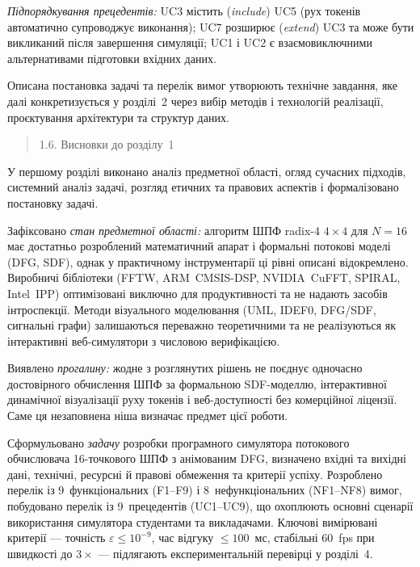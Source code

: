 \emph{Підпорядкування прецедентів:} UC3 містить (\emph{include}) UC5
(рух токенів автоматично супроводжує виконання); UC7 розширює
(\emph{extend}) UC3 та може бути викликаний після завершення симуляції;
UC1 і UC2 є взаємовиключними альтернативами підготовки вхідних даних.

Описана постановка задачі та перелік вимог утворюють технічне завдання,
яке далі конкретизується у розділі~2 через вибір методів і технологій
реалізації, проєктування архітектури та структур даних.

\begin{quote}
\protect{}\label{_Toc229682910}{}1.6. Висновки до розділу~1
\end{quote}

У першому розділі виконано аналіз предметної області, огляд сучасних
підходів, системний аналіз задачі, розгляд етичних та правових аспектів
і формалізовано постановку задачі.

Зафіксовано \emph{стан предметної області:} алгоритм ШПФ radix-4
\(4 \times 4\) для \(N = 16\) має достатньо розроблений математичний
апарат і формальні потокові моделі (DFG, SDF), однак у практичному
інструментарії ці рівні описані відокремлено. Виробничі бібліотеки
(FFTW, ARM~CMSIS-DSP, NVIDIA~CuFFT, SPIRAL, Intel~IPP) оптимізовані
виключно для продуктивності та не надають засобів інтроспекції. Методи
візуального моделювання (UML, IDEF0, DFG/SDF, сигнальні графи)
залишаються переважно теоретичними та не реалізуються як інтерактивні
веб-симулятори з числовою верифікацією.

Виявлено \emph{прогалину:} жодне з розглянутих рішень не поєднує
одночасно достовірного обчислення ШПФ за формальною SDF-моделлю,
інтерактивної динамічної візуалізації руху токенів і веб-доступності без
комерційної ліцензії. Саме ця незаповнена ніша визначає предмет цієї
роботи.

Сформульовано \emph{задачу} розробки програмного симулятора потокового
обчислювача 16-точкового ШПФ з анімованим DFG, визначено вхідні та
вихідні дані, технічні, ресурсні й правові обмеження та критерії успіху.
Розроблено перелік із 9~функціональних (F1--F9) і 8~нефункціональних
(NF1--NF8) вимог, побудовано перелік із 9~прецедентів (UC1--UC9), що
охоплюють основні сценарії використання симулятора студентами та
викладачами. Ключові вимірювані критерії --- точність
\(\varepsilon \leq 10^{- 9}\), час відгуку \(\leq 100\)~мс, стабільні
60~fps при швидкості до \(3 \times\) --- підлягають експериментальній
перевірці у розділі~4.

